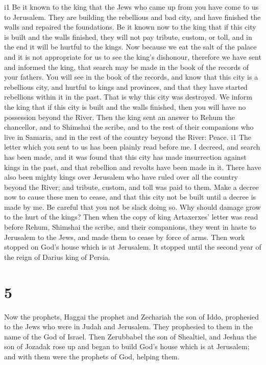 i1 Be it known to the king that the Jews who came up from
you have come to us to Jerusalem. They are building the rebellious and
bad city, and have finished the walls and repaired the foundations.
 Be it known now to the king that if this city is built
and the walls finished, they will not pay tribute, custom, or toll, and
in the end it will be hurtful to the kings.  Now because
we eat the salt of the palace and it is not appropriate for us to see
the king's dishonour, therefore we have sent and informed the king,
 that search may be made in the book of the records of
your fathers. You will see in the book of the records, and know that
this city is a rebellious city, and hurtful to kings and provinces, and
that they have started rebellions within it in the past. That is why
this city was destroyed.  We inform the king that if this
city is built and the walls finished, then you will have no possession
beyond the River.  Then the king sent an answer to Rehum
the chancellor, and to Shimshai the scribe, and to the rest of their
companions who live in Samaria, and in the rest of the country beyond
the River: Peace. i1 The letter which you sent to us has
been plainly read before me.  I decreed, and search has
been made, and it was found that this city has made insurrection against
kings in the past, and that rebellion and revolts have been made in it.
 There have also been mighty kings over Jerusalem who
have ruled over all the country beyond the River; and tribute, custom,
and toll was paid to them.  Make a decree now to cause
these men to cease, and that this city not be built until a decree is
made by me.  Be careful that you not be slack doing so.
Why should damage grow to the hurt of the kings?  Then
when the copy of king Artaxerxes' letter was read before Rehum, Shimshai
the scribe, and their companions, they went in haste to Jerusalem to the
Jews, and made them to cease by force of arms.  Then work
stopped on God's house which is at Jerusalem. It stopped until the
second year of the reign of Darius king of Persia.

\hypertarget{section-4}{%
\section{5}\label{section-4}}

 Now the prophets, Haggai the prophet and Zechariah the
son of Iddo, prophesied to the Jews who were in Judah and Jerusalem.
They prophesied to them in the name of the God of Israel. 
Then Zerubbabel the son of Shealtiel, and Jeshua the son of Jozadak rose
up and began to build God's house which is at Jerusalem; and with them
were the prophets of God, helping them.

